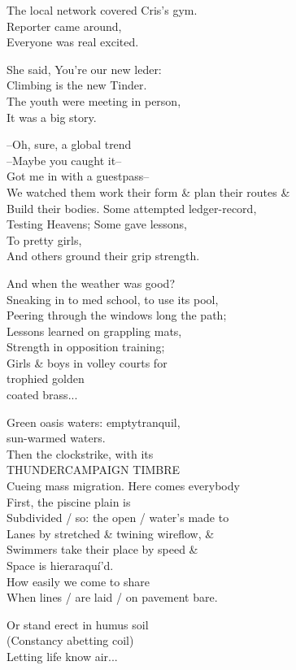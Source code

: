 
The local network covered Cris's gym. \\
Reporter came around,  \\
Everyone was real excited. 

She said, You're our new leder:  \\
Climbing is the new Tinder. \\
The youth were meeting in person, \\
It was a big story. 

--Oh, sure, a global trend\\
\qquad --Maybe you caught it-- \\

Got me in with a guestpass-- \\
We watched them work their form \& plan their routes \& \\
Build their bodies. Some attempted ledger-record, \\
Testing Heavens; Some gave lessons, \\
To pretty girls, \\
And others ground their grip strength. 

And when the weather was good? \\ %
Sneaking in to med school, to use its pool, \\
Peering through the windows long the path; \\
Lessons learned on grappling mats, \\
Strength in opposition training; \\
Girls \& boys in volley courts for \\
\quad trophied golden \\
\qquad coated brass...

Green oasis waters: emptytranquil, \\
\quad sun-warmed waters. \\
Then the clockstrike, with its \\ 
THUNDERCAMPAIGN TIMBRE \\
Cueing mass migration. Here comes everybody \\
First, the piscine plain is \\
Subdivided / so: the open / water's made to \\
Lanes by stretched \& twining wireflow, \& \\
Swimmers take their place by speed \& \\
Space is hieraraquí'd. \\
How easily we come to share \\
When lines / are laid / on pavement bare.

Or stand erect in humus soil \\
(Constancy abetting coil) \\
Letting life know air...